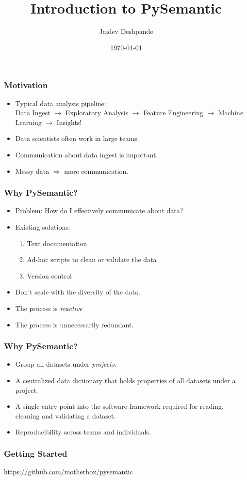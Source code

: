 \documentclass{beamer}
\title[Introduction to PySemantic]{Introduction to PySemantic}
\author{Jaidev Deshpande} %
\institute[DataCulture Analytics Company] %
\date{\today} %
\begin{document}
\begin{frame}
\titlepage %
\end{frame}

\begin{frame}
\frametitle{Motivation}
\begin{itemize}
\item Typical data analysis pipeline:\\
Data Ingest $\rightarrow$ Exploratory Analysis $\rightarrow$ Feature Engineering $\rightarrow$ Machine Learning $\rightarrow$ Insights!
\item Data scientists often work in large teams.
\item Communication about data ingest is important.
\item Messy data $\Rightarrow$ more communication.
\end{itemize}
\end{frame}

\begin{frame}
    \frametitle{Why PySemantic?}
    \begin{itemize}
        \item Problem: How do I effectively communicate about data?
        \item Existing solutions:\\
            \begin{enumerate}
                \item Text documentation
                \item Ad-hoc scripts to clean or validate the data
                \item Version control
            \end{enumerate}
        \item Don't scale with the diversity of the data.
        \item The process is \textit{reactive}
        \item The process is unnecessarily redundant.
    \end{itemize}
\end{frame}

\begin{frame}
    \frametitle{Why PySemantic?}
    \begin{itemize}
        \item Group all datasets under \textit{projects}.
        \item A centralized data dictionary that holds properties of all
            datasets under a project.
        \item A single entry point into the software framework required for
            reading, cleaning and validating a dataset.
        \item Reproducibility across teams and individuals.
    \end{itemize}
\end{frame}

\begin{frame}
    \frametitle{Getting Started}
    \url{https://github.com/motherbox/pysemantic}
\end{frame}


\end{document}
